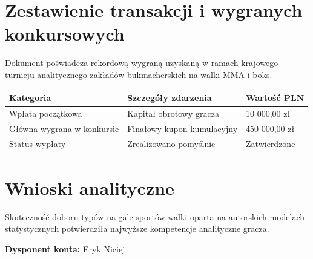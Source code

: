 \section*{Zestawienie transakcji i wygranych konkursowych}
Dokument poświadcza rekordową wygraną uzyskaną w ramach krajowego turnieju analitycznego zakładów bukmacherskich na walki MMA i boks.

\begin{tabularx}{\textwidth}{lXX}
\toprule
\textbf{Kategoria} & \textbf{Szczegóły zdarzenia} & \textbf{Wartość PLN} \\
\midrule
Wpłata początkowa & Kapitał obrotowy gracza & 10 000,00 zł \\
Główna wygrana w konkursie & Finałowy kupon kumulacyjny & 450 000,00 zł \\
Status wypłaty & Zrealizowano pomyślnie & Zatwierdzone \\
\bottomrule
\end{tabularx}

\section*{Wnioski analityczne}
Skuteczność doboru typów na gale sportów walki oparta na autorskich modelach statystycznych potwierdziła najwyższe kompetencje analityczne gracza.

\vspace{1cm}
\noindent\textbf{Dysponent konta:} Eryk Niciej